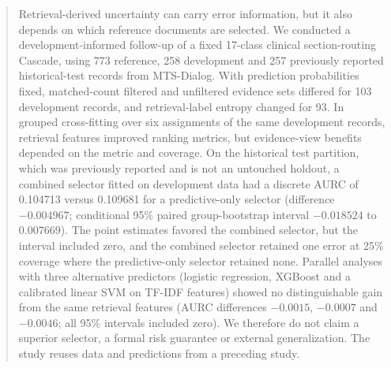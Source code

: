 \begin{abstract}
Retrieval-derived uncertainty can carry error information, but it also depends on which reference documents are selected. We conducted a development-informed follow-up of a fixed 17-class clinical section-routing Cascade, using 773 reference, 258 development and 257 previously reported historical-test records from MTS-Dialog. With prediction probabilities fixed, matched-count filtered and unfiltered evidence sets differed for 103 development records, and retrieval-label entropy changed for 93. In grouped cross-fitting over six assignments of the same development records, retrieval features improved ranking metrics, but evidence-view benefits depended on the metric and coverage. On the historical test partition, which was previously reported and is not an untouched holdout, a combined selector fitted on development data had a discrete AURC of 0.104713 versus 0.109681 for a predictive-only selector (difference $-0.004967$; conditional 95\% paired group-bootstrap interval $-0.018524$ to $0.007669$). The point estimates favored the combined selector, but the interval included zero, and the combined selector retained one error at 25\% coverage where the predictive-only selector retained none. Parallel analyses with three alternative predictors (logistic regression, XGBoost and a calibrated linear SVM on TF-IDF features) showed no distinguishable gain from the same retrieval features (AURC differences $-0.0015$, $-0.0007$ and $-0.0046$; all 95\% intervals included zero). We therefore do not claim a superior selector, a formal risk guarantee or external generalization. The study reuses data and predictions from a preceding study.
\end{abstract}
